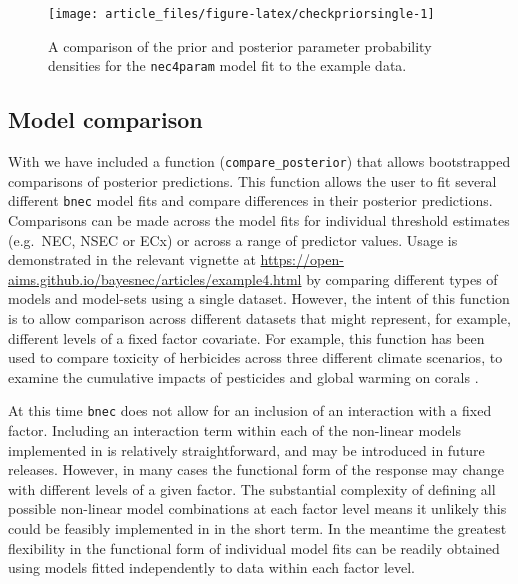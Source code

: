 \documentclass[
  shortnames]{jss}
\begin{document}
\begin{CodeChunk}
\begin{figure}[!ht]

{\centering \texttt{[image: article\_files/figure-latex/checkpriorsingle-1]} 

}

\caption[A comparison of the prior and posterior parameter probability densities for the \texttt{nec4param} model fit to the example data]{A comparison of the prior and posterior parameter probability densities for the \texttt{nec4param} model fit to the example data.}\label{fig:checkpriorsingle}
\end{figure}
\end{CodeChunk}

\hypertarget{model-comparison}{%
\subsection{Model comparison}\label{model-comparison}}

With  we have included a function (\texttt{compare\_posterior}) that allows bootstrapped comparisons of posterior predictions. This function allows the user to fit several different \texttt{bnec} model fits and compare differences in their posterior predictions. Comparisons can be made across the model fits for individual threshold estimates (e.g.~NEC, NSEC or ECx) or across a range of predictor values. Usage is demonstrated in the relevant vignette at \url{https://open-aims.github.io/bayesnec/articles/example4.html} by comparing different types of models and model-sets using a single dataset. However, the intent of this function is to allow comparison across different datasets that might represent, for example, different levels of a fixed factor covariate. For example, this function has been used to compare toxicity of herbicides across three different climate scenarios, to examine the cumulative impacts of pesticides and global warming on corals \citep{flores2021}.

At this time \texttt{bnec} does not allow for an inclusion of an interaction with a fixed factor. Including an interaction term within each of the non-linear models implemented in  is relatively straightforward, and may be introduced in future releases. However, in many cases the functional form of the response may change with different levels of a given factor. The substantial complexity of defining all possible non-linear model combinations at each factor level means it unlikely this could be feasibly implemented in  in the short term. In the meantime the greatest flexibility in the functional form of individual model fits can be readily obtained using models fitted independently to data within each factor level.
\end{document}
